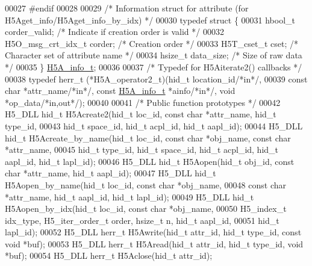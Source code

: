 \begin{DoxyCode}
00027 \textcolor{preprocessor}{#endif}
00028 
00029 \textcolor{comment}{/* Information struct for attribute (for H5Aget\_info/H5Aget\_info\_by\_idx) */}
00030 \textcolor{keyword}{typedef} \textcolor{keyword}{struct }\{
00031     hbool\_t             corder\_valid;   \textcolor{comment}{/* Indicate if creation order is valid */}
00032     H5O\_msg\_crt\_idx\_t   corder;         \textcolor{comment}{/* Creation order                 */}
00033     H5T\_cset\_t          cset;           \textcolor{comment}{/* Character set of attribute name */}
00034     hsize\_t             data\_size;      \textcolor{comment}{/* Size of raw data       */}
00035 \} \hyperlink{struct_h5_a__info__t}{H5A\_info\_t};
00036 
00037 \textcolor{comment}{/* Typedef for H5Aiterate2() callbacks */}
00038 \textcolor{keyword}{typedef} herr\_t (*H5A\_operator2\_t)(hid\_t location\_id\textcolor{comment}{/*in*/},
00039     \textcolor{keyword}{const} \textcolor{keywordtype}{char} *attr\_name\textcolor{comment}{/*in*/}, \textcolor{keyword}{const} \hyperlink{struct_h5_a__info__t}{H5A\_info\_t} *ainfo\textcolor{comment}{/*in*/}, \textcolor{keywordtype}{void} *op\_data\textcolor{comment}{/*in,out*/});
00040 
00041 \textcolor{comment}{/* Public function prototypes */}
00042 H5\_DLL hid\_t   H5Acreate2(hid\_t loc\_id, \textcolor{keyword}{const} \textcolor{keywordtype}{char} *attr\_name, hid\_t type\_id,
00043     hid\_t space\_id, hid\_t acpl\_id, hid\_t aapl\_id);
00044 H5\_DLL hid\_t   H5Acreate\_by\_name(hid\_t loc\_id, \textcolor{keyword}{const} \textcolor{keywordtype}{char} *obj\_name, \textcolor{keyword}{const} \textcolor{keywordtype}{char} *attr\_name,
00045     hid\_t type\_id, hid\_t space\_id, hid\_t acpl\_id, hid\_t aapl\_id, hid\_t lapl\_id);
00046 H5\_DLL hid\_t   H5Aopen(hid\_t obj\_id, \textcolor{keyword}{const} \textcolor{keywordtype}{char} *attr\_name, hid\_t aapl\_id);
00047 H5\_DLL hid\_t   H5Aopen\_by\_name(hid\_t loc\_id, \textcolor{keyword}{const} \textcolor{keywordtype}{char} *obj\_name,
00048     \textcolor{keyword}{const} \textcolor{keywordtype}{char} *attr\_name, hid\_t aapl\_id, hid\_t lapl\_id);
00049 H5\_DLL hid\_t   H5Aopen\_by\_idx(hid\_t loc\_id, \textcolor{keyword}{const} \textcolor{keywordtype}{char} *obj\_name,
00050     H5\_index\_t idx\_type, H5\_iter\_order\_t order, hsize\_t n, hid\_t aapl\_id,
00051     hid\_t lapl\_id);
00052 H5\_DLL herr\_t  H5Awrite(hid\_t attr\_id, hid\_t type\_id, \textcolor{keyword}{const} \textcolor{keywordtype}{void} *buf);
00053 H5\_DLL herr\_t  H5Aread(hid\_t attr\_id, hid\_t type\_id, \textcolor{keywordtype}{void} *buf);
00054 H5\_DLL herr\_t  H5Aclose(hid\_t attr\_id);

\end{DoxyCode}
